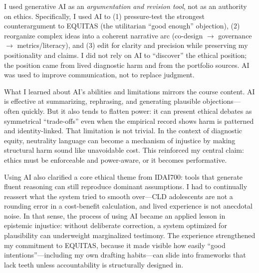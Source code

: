 I used generative AI as an \emph{argumentation and revision tool}, not as an authority on ethics. Specifically, I used AI to (1) pressure-test the strongest counterargument to EQUITAS (the utilitarian ``good enough'' objection), (2) reorganize complex ideas into a coherent narrative arc (co-design $\rightarrow$ governance $\rightarrow$ metrics/literacy), and (3) edit for clarity and precision while preserving my positionality and claims. I did not rely on AI to ``discover'' the ethical position; the position came from lived diagnostic harm and from the portfolio sources. AI was used to improve communication, not to replace judgment.

\vspace{0.5em}
What I learned about AI’s abilities and limitations mirrors the course content. AI is effective at summarizing, rephrasing, and generating plausible objections—often quickly. But it also tends to flatten power: it can present ethical debates as symmetrical ``trade-offs'' even when the empirical record shows harm is patterned and identity-linked. That limitation is not trivial. In the context of diagnostic equity, neutrality language can become a mechanism of injustice by making structural harm sound like unavoidable cost. This reinforced my central claim: ethics must be enforceable and power-aware, or it becomes performative.

\vspace{0.5em}
Using AI also clarified a core ethical theme from IDAI700: tools that generate fluent reasoning can still reproduce dominant assumptions. I had to continually reassert what the system tried to smooth over—CLD adolescents are not a rounding error in a cost-benefit calculation, and lived experience is not anecdotal noise. In that sense, the process of using AI became an applied lesson in epistemic injustice: without deliberate correction, a system optimized for plausibility can underweight marginalized testimony. The experience strengthened my commitment to EQUITAS, because it made visible how easily ``good intentions''—including my own drafting habits—can slide into frameworks that lack teeth unless accountability is structurally designed in.

\clearpage




